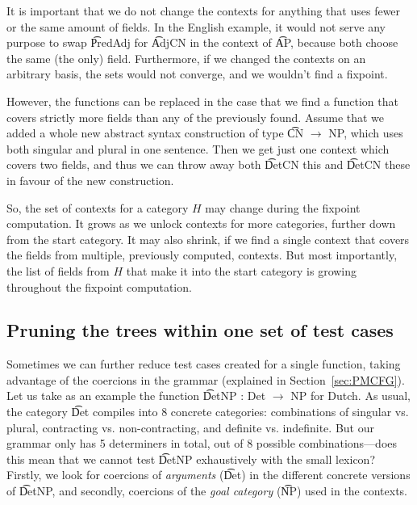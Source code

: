 It is important that we do not change the contexts for anything that
uses fewer or the same amount of fields. In the English example, it
would not serve any purpose to swap \t{PredAdj} for \t{AdjCN} in the
context of \t{AP}, because both choose the same (the only)
field. Furthermore, if we changed the contexts on an arbitrary basis,
the sets would not converge, and we wouldn't find a fixpoint.

However, the functions can be replaced in the case that we find a
function that covers strictly more fields than any of the previously found.
Assume that we added a whole new abstract syntax construction of type
\t{CN $\rightarrow$ NP}, which uses both singular and plural in one
sentence. Then we get just one context which covers two fields, and
thus we can throw away both \t{DetCN this} and \t{DetCN these} in
favour of the new construction.

So, the set of contexts for a category $H$ may change during the
fixpoint computation. It grows as we unlock contexts for more
categories, further down from the start category. It may also shrink,
if we find a single context that covers the fields from multiple,
previously computed, contexts. But most importantly, the list of
fields from $H$ that make it into the start category is growing
throughout the fixpoint computation. 



\subsection{Pruning the trees within one set of test cases} 


Sometimes we can further reduce test cases created for a single
function, taking advantage of the coercions in the grammar (explained
in Section~\ref{sec:PMCFG}).  Let us take as an example the function
\t{DetNP : Det $\rightarrow$ NP} for Dutch. As usual, the category
\t{Det} compiles into 8 concrete categories: combinations of singular
vs. plural, contracting vs.  non-contracting, and definite
vs. indefinite. But our grammar only has 5 determiners in total, out
of 8 possible combinations---does this mean that we cannot test
\t{DetNP} exhaustively with the small lexicon? Firstly, we look for
coercions of \emph{arguments} (\t{Det}) in the different concrete
versions of \t{DetNP}, and secondly, coercions of the \emph{goal
  category} (\t{NP}) used in the contexts.

